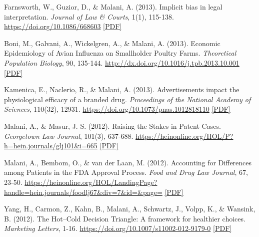 \begin{tablist}
        \item[2013] \tab{}Farnsworth, W., Guzior, D., \& Malani, A. (2013). Implicit bias in legal interpretation. \textit{Journal of Law \& Courts}, 1(1), 115-138. \href{https://doi.org/10.1086/668603}{https://doi.org/10.1086/668603} \href{https://github.com/anup-malani/website_personal/blob/main/publications/2013_FarnsworthGuziorMalani_PolicyPreferencesLegalInterpretation.pdf}{[PDF]} 
    
        \item[2013] \tab{}Boni, M., Galvani, A., Wickelgren, A., \& Malani, A. (2013). Economic Epidemiology of Avian Influenza on Smallholder Poultry Farms. \textit{Theoretical Population Biology}, 90, 135-144. \href{http://dx.doi.org/10.1016/j.tpb.2013.10.001}{http://dx.doi.org/10.1016/j.tpb.2013.10.001} \href{https://github.com/anup-malani/website_personal/blob/main/publications/2013_BoniMalani_AvianFlu.pdf}{[PDF]}
    
        \item[2013] \tab{}Kamenica, E., Naclerio, R., \& Malani, A. (2013). Advertisements impact the physiological efficacy of a branded drug. \textit{Proceedings of the National Academy of Sciences}, 110(32), 12931. \href{https://doi.org/10.1073/pnas.1012818110}{https://doi.org/10.1073/pnas.1012818110} \href{https://github.com/anup-malani/website_personal/blob/main/publications/2013_KamenicaMalani_PNAS_PlaceboAds.pdf}{[PDF]} 
    
        \item[2012] \tab{}Malani, A., \& Masur, J. S. (2012). Raising the Stakes in Patent Cases. \textit{Georgetown Law Journal}, 101(3), 637-688. \href{https://heinonline.org/HOL/P?h=hein.journals/glj101&i=665}{https://heinonline.org/HOL/P?h=hein.journals/glj101\&i=665} \href{https://github.com/anup-malani/website_personal/blob/main/publications/2012_MalaniMasur_PatentDamages.PDF}{[PDF]}

        \item[2012] \tab{}Malani, A., Bembom, O., \& van der Laan, M. (2012). Accounting for Differences among Patients in the FDA Approval Process. \textit{Food and Drug Law Journal}, 67, 23-50. \href{https://heinonline.org/HOL/LandingPage?handle=hein.journals/foodlj67&div=7&id=&page=}{https://heinonline.org/HOL/LandingPage?handle=hein.journals/foodlj67\&div=7\&id=\&page=} \href{https://github.com/anup-malani/website_personal/blob/main/publications/2012_Malani_FDAHetergeneousTreatmentEffects.pdf}{[PDF]}
    
        \item[2012] \tab{}Yang, H., Carmon, Z., Kahn, B., Malani, A., Schwartz, J., Volpp, K., \& Wansink, B. (2012). The Hot–Cold Decision Triangle: A framework for healthier choices. \textit{Marketing Letters}, 1-16. \href{https://doi.org/10.1007/s11002-012-9179-0}{https://doi.org/10.1007/s11002-012-9179-0} \href{https://github.com/anup-malani/website_personal/blob/main/publications/2012_YangMalani_MarketingLetters_HotColdTriangle.pdf}{[PDF]}  
    

\end{tablist}
